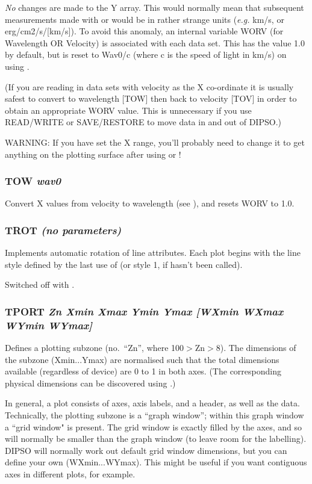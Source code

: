 \documentclass[twoside,11pt,noabs,nolof]{starlink}
\providecommand{\dipcom}[3]{\subsubsection*{\label{COM:#1}\textbf{#1} \emph{#2}}}
\begin{document}
\emph{No} changes are made to the Y array. This would normally mean
that subsequent measurements made with   or   would be in rather
strange units (\emph{e.g.} km/s, or erg/cm2/s/[km/s]). To avoid this
anomaly, an internal variable WORV (for Wavelength OR Velocity) is
associated with each data set. This has the value 1.0 by default, but
is reset to Wav0/c (where c is the speed of light in km/s) on using
.

(If you are reading in data sets with velocity as the X co-ordinate it
is usually safest to convert to wavelength [TOW] then back to velocity
[TOV] in order to obtain an appropriate WORV value. This is
unnecessary if you use READ/WRITE or SAVE/RESTORE to move data in and
out of DIPSO.)

WARNING: If you have set the X range, you'll probably need to change
it to get anything on the plotting surface after using   or !

\dipcom{TOW}{wav0}{Converts X values from velocity to wavelength }
Convert X values from velocity to wavelength (see ),  and resets
WORV to 1.0.

\dipcom{TROT}{(no parameters)}{Switches on automatic rotation of line style (i.e. attributes)}
Implements automatic rotation of line attributes. Each plot begins
with the line style defined by the last use of   (or style 1, if
  hasn't been called).

Switched off with .

\dipcom{TPORT}{Zn Xmin Xmax Ymin Ymax [WXmin WXmax WYmin WYmax]}{Defines a plotting sub-zone}
Defines a plotting subzone (no.\ ``Zn'', where 100$>$Zn$>$8). The
dimensions of the subzone (Xmin...Ymax) are normalised such that the
total dimensions available (regardless of device) are 0 to 1 in both
axes. (The corresponding physical dimensions can be discovered using
.)

In general, a plot consists of axes, axis labels, and a header, as
well as the data. Technically, the plotting subzone is a ``graph
window''; within this graph window a ``grid window" is present. The
grid window is exactly filled by the axes, and so will normally be
smaller than the graph window (to leave room for the labelling). DIPSO
will normally work out default grid window dimensions, but you can
define your own (WXmin...WYmax). This might be useful if you want
contiguous axes in different plots, for example.
\end{document}
